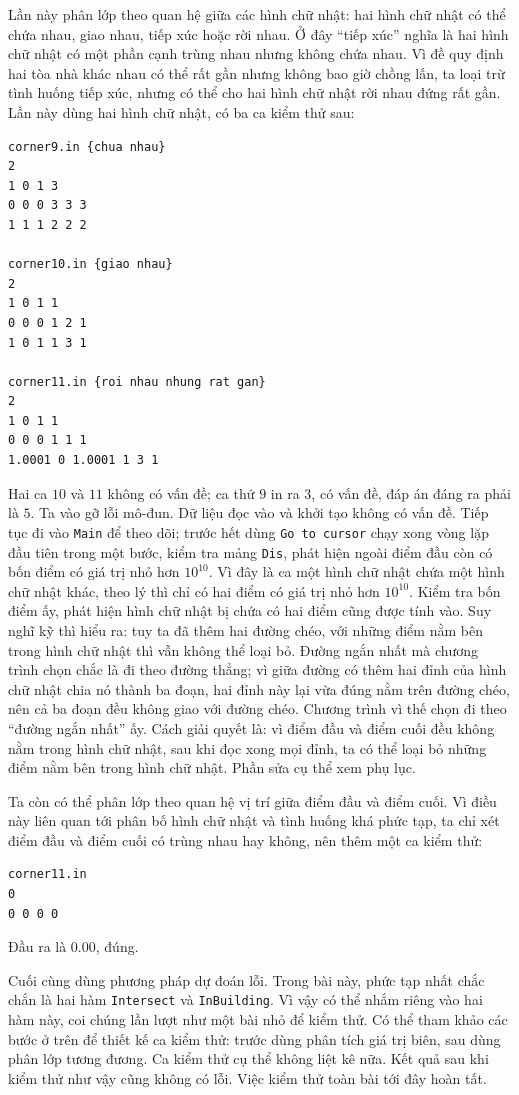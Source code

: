 \documentclass[11pt]{article}
\begin{document}
Lần này phân lớp theo quan hệ giữa các hình chữ nhật: hai hình chữ nhật có
thể chứa nhau, giao nhau, tiếp xúc hoặc rời nhau. Ở đây ``tiếp xúc'' nghĩa là
hai hình chữ nhật có một phần cạnh trùng nhau nhưng không chứa nhau. Vì đề
quy định hai tòa nhà khác nhau có thể rất gần nhưng không bao giờ chồng lấn,
ta loại trừ tình huống tiếp xúc, nhưng có thể cho hai hình chữ nhật rời nhau
đứng rất gần. Lần này dùng hai hình chữ nhật, có ba ca kiểm thử sau:
\begin{verbatim}
corner9.in {chua nhau}
2
1 0 1 3
0 0 0 3 3 3
1 1 1 2 2 2

corner10.in {giao nhau}
2
1 0 1 1
0 0 0 1 2 1
1 0 1 1 3 1

corner11.in {roi nhau nhung rat gan}
2
1 0 1 1
0 0 0 1 1 1
1.0001 0 1.0001 1 3 1
\end{verbatim}
Hai ca \(10\) và \(11\) không có vấn đề; ca thứ \(9\) in ra \(3\), có vấn đề,
đáp án đáng ra phải là \(5\). Ta vào gỡ lỗi mô-đun. Dữ liệu đọc vào và khởi
tạo không có vấn đề. Tiếp tục đi vào \texttt{Main} để theo dõi; trước hết
dùng \texttt{Go to cursor} chạy xong vòng lặp đầu tiên trong một bước, kiểm
tra mảng \texttt{Dis}, phát hiện ngoài điểm đầu còn có bốn điểm có giá trị
nhỏ hơn \(10^{10}\). Vì đây là ca một hình chữ nhật chứa một hình chữ nhật
khác, theo lý thì chỉ có hai điểm có giá trị nhỏ hơn \(10^{10}\). Kiểm tra
bốn điểm ấy, phát hiện hình chữ nhật bị chứa có hai điểm cũng được tính vào.
Suy nghĩ kỹ thì hiểu ra: tuy ta đã thêm hai đường chéo, với những điểm nằm
bên trong hình chữ nhật thì vẫn không thể loại bỏ. Đường ngắn nhất mà chương
trình chọn chắc là đi theo đường thẳng; vì giữa đường có thêm hai đỉnh của
hình chữ nhật chia nó thành ba đoạn, hai đỉnh này lại vừa đúng nằm trên đường
chéo, nên cả ba đoạn đều không giao với đường chéo. Chương trình vì thế chọn
đi theo ``đường ngắn nhất'' ấy. Cách giải quyết là: vì điểm đầu và điểm cuối
đều không nằm trong hình chữ nhật, sau khi đọc xong mọi đỉnh, ta có thể loại
bỏ những điểm nằm bên trong hình chữ nhật. Phần sửa cụ thể xem phụ lục.

Ta còn có thể phân lớp theo quan hệ vị trí giữa điểm đầu và điểm cuối. Vì
điều này liên quan tới phân bố hình chữ nhật và tình huống khá phức tạp, ta
chỉ xét điểm đầu và điểm cuối có trùng nhau hay không, nên thêm một ca kiểm
thử:
\begin{verbatim}
corner11.in
0
0 0 0 0
\end{verbatim}
Đầu ra là \(0.00\), đúng.

Cuối cùng dùng phương pháp dự đoán lỗi. Trong bài này, phức tạp nhất chắc
chắn là hai hàm \texttt{Intersect} và \texttt{InBuilding}. Vì vậy có thể nhắm
riêng vào hai hàm này, coi chúng lần lượt như một bài nhỏ để kiểm thử. Có thể
tham khảo các bước ở trên để thiết kế ca kiểm thử: trước dùng phân tích giá
trị biên, sau dùng phân lớp tương đương. Ca kiểm thử cụ thể không liệt kê
nữa. Kết quả sau khi kiểm thử như vậy cũng không có lỗi. Việc kiểm thử toàn
bài tới đây hoàn tất.
\end{document}
